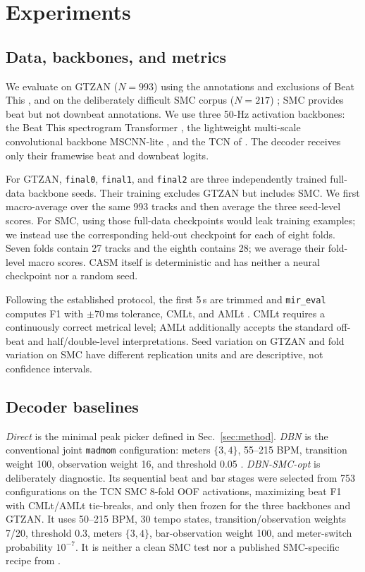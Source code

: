 \documentclass{article}
\begin{document}
\section{Experiments}
\label{sec:exp}

\subsection{Data, backbones, and metrics}

We evaluate on GTZAN ($N=993$) using the annotations and exclusions of Beat
This \cite{foscarin2024beat}, and on the deliberately difficult SMC corpus
($N=217$) \cite{smc}; SMC provides beat but not downbeat annotations. We use
three 50-Hz activation backbones: the Beat This spectrogram Transformer
\cite{foscarin2024beat}, the lightweight multi-scale convolutional backbone
MSCNN-lite \cite{he2026dynest}, and the TCN of
\cite{bock2020deconstruct}. The decoder receives only their framewise beat
and downbeat logits.

For GTZAN, \texttt{final0}, \texttt{final1}, and \texttt{final2} are three
independently trained full-data backbone seeds. Their training excludes
GTZAN but includes SMC. We first macro-average over the same 993 tracks and
then average the three seed-level scores. For SMC, using those full-data
checkpoints would leak training examples; we instead use the corresponding
held-out checkpoint for each of eight folds. Seven folds contain 27 tracks and
the eighth contains 28; we average their fold-level macro scores. CASM itself
is deterministic and has neither a neural checkpoint nor a random seed.

Following the established protocol, the first 5\,s are trimmed and
\texttt{mir\_eval} computes F1 with $\pm70$\,ms tolerance, CMLt, and AMLt
\cite{raffel2014mireval}. CMLt requires a continuously correct metrical
level; AMLt additionally accepts the standard off-beat and half/double-level
interpretations. Seed variation on GTZAN and fold variation on SMC have
different replication units and are descriptive, not confidence intervals.

\subsection{Decoder baselines}

\emph{Direct} is the minimal peak picker defined in
Sec.~\ref{sec:method}. \emph{DBN} is the conventional joint
\texttt{madmom} configuration: meters $\{3,4\}$, 55--215 BPM,
transition weight 100, observation weight 16, and threshold 0.05
\cite{krebs2015dbn}. \emph{DBN-SMC-opt} is deliberately diagnostic. Its
sequential beat and bar stages were selected from 753 configurations on the
TCN SMC 8-fold OOF activations, maximizing beat F1 with CMLt/AMLt tie-breaks,
and only then frozen for the three backbones and GTZAN. It uses 50--215 BPM,
30 tempo states, transition/observation weights 7/20, threshold 0.3,
meters $\{3,4\}$, bar-observation weight 100, and meter-switch probability
$10^{-7}$. It is neither a clean SMC test nor a published
SMC-specific recipe from \cite{bock2020deconstruct}.
\end{document}
